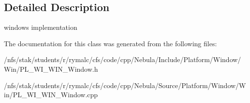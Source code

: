\subsection{Detailed Description}
windows implementation 

The documentation for this class was generated from the following files:\begin{DoxyCompactItemize}
\item 
/nfs/stak/students/r/rymalc/cfs/code/cpp/Nebula/Include/Platform/Window/Win/PL\_\-WI\_\-WIN\_\-Window.h\item 
/nfs/stak/students/r/rymalc/cfs/code/cpp/Nebula/Source/Platform/Window/Win/PL\_\-WI\_\-WIN\_\-Window.cpp\end{DoxyCompactItemize}
